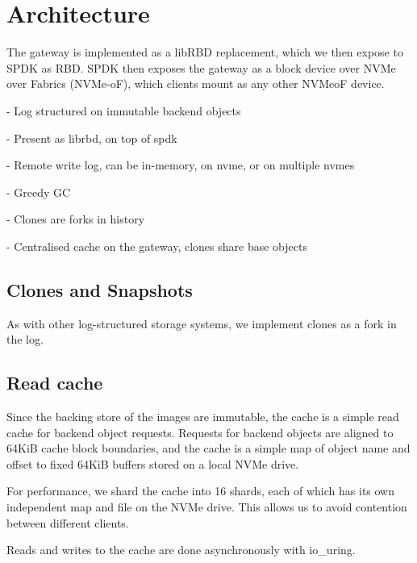\section{Architecture}

The gateway is implemented as a libRBD replacement, which we then expose to
SPDK as RBD. SPDK then exposes the gateway as a block device over NVMe over
Fabrics (NVMe-oF), which clients mount as any other NVMeoF device.


- Log structured on immutable backend objects

- Present as librbd, on top of spdk

- Remote write log, can be in-memory, on nvme, or on multiple nvmes

- Greedy GC

- Clones are forks in history

- Centralised cache on the gateway, clones share base objects

\subsection{Clones and Snapshots}

As with other log-structured storage systems, we implement clones as a fork in
the log. 

\subsection{Read cache}

Since the backing store of the images are immutable, the cache is a simple read
cache for backend object requests. Requests for backend objects are aligned
to 64KiB cache block boundaries, and the cache is a simple map of object name
and offset to fixed 64KiB buffers stored on a local NVMe drive.

For performance, we shard the cache into 16 shards, each of which has its own
independent map and file on the NVMe drive. This allows us to avoid contention
between different clients.

Reads and writes to the cache are done asynchronously with io\_uring.

